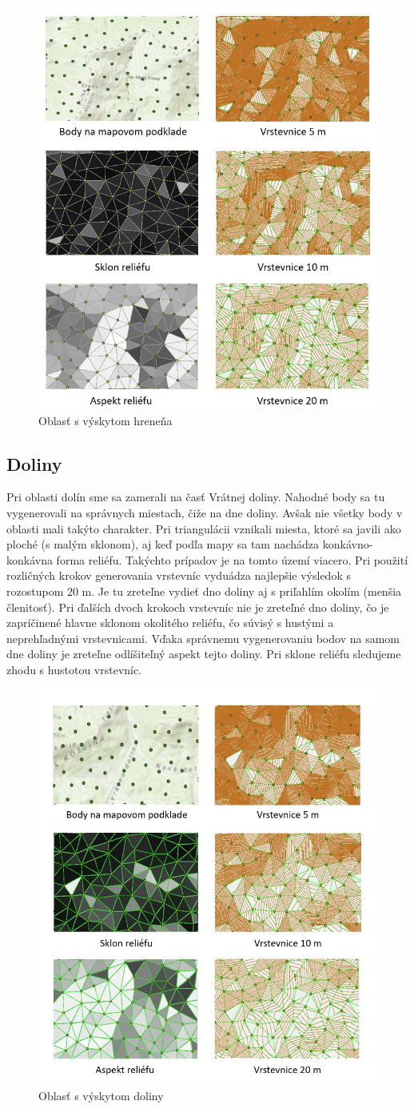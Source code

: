 \documentclass[12pt]{article}
\begin{document}
\begin{figure}[h]
    \centering
    \includegraphics[width=0.56\linewidth]{latex/images/chrbat.jpg}
    \caption{Oblasť s výskytom hreneňa}
    \label{fig:enter-label}
\end{figure}
\newpage
\subsection*{Doliny}
Pri oblasti dolín sme sa zamerali na časť Vrátnej doliny. Nahodné body sa tu vygenerovali na správnych miestach, čiže na dne doliny. Avšak nie všetky body v oblasti mali takýto charakter. Pri triangulácii vznikali miesta, ktoré sa javili ako ploché (s malým sklonom), aj keď podľa mapy sa tam nachádza konkávno-konkávna forma reliéfu. Takýchto prípadov je na tomto území viacero. Pri použití rozličných krokov generovania vrstevníc vyduádza najlepšie výsledok s rozostupom 20 m. Je tu zreteľne vydieť dno doliny aj s priľahlím okolím (menšia členitosť). Pri ďalších dvoch krokoch vrstevníc nie je zreteľné dno doliny, čo je zapríčinené hlavne sklonom okolitého reliéfu, čo súvisý s hustými a neprehľadnými vrstevnicami. Vďaka správnemu vygenerovaniu bodov na samom dne doliny je zreteľne odlíšiteľný aspekt tejto doliny. Pri sklone reliéfu sledujeme zhodu s hustotou vrstevníc. 

\begin{figure}[h]
    \centering
    \includegraphics[width=0.6\linewidth]{latex/images/dolina.jpg}
    \caption{Oblasť s výskytom doliny}
    \label{fig:enter-label}
\end{figure}
\end{document}

